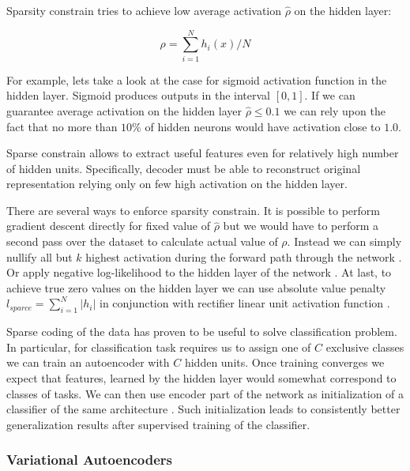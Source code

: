 Sparsity constrain tries to achieve low average activation $\hat{\rho}$ on the hidden layer:

\begin{equation}\label{eq:avgh}
  \rho = \sum_{i=1}^N h_i(x)/N
\end{equation}

For example, lets take a look at the case for sigmoid activation function in the hidden layer.
Sigmoid produces outputs in the interval $[0, 1]$. If we can guarantee average activation on the hidden layer $\hat{\rho} \leq 0.1$ we can rely upon the fact that no more than $10\%$ of hidden neurons would have activation close to $1.0$.

Sparse constrain allows to extract useful features even for relatively high number of hidden units. Specifically, decoder must be able to reconstruct original representation relying only on few high activation on the hidden layer.

There are several ways to enforce sparsity constrain.
It is possible to perform gradient descent directly for fixed value of $\hat{\rho}$ but we would have to perform a second pass over the dataset to calculate actual value of $\rho$. Instead we can simply nullify all but $k$ highest activation during the forward path through the network \cite{Kulkarni2015}.
Or apply negative log-likelihood to the hidden layer of the network \cite{Zhao2015}.
At last, to achieve true zero values on the hidden layer we can use absolute value penalty $l_{sparce}=\sum_{i=1}^N |h_i|$ in conjunction with rectifier linear unit activation function \cite{Glorot2011}.

Sparse coding of the data has proven to be useful to solve classification problem.
In particular, for classification task requires us to assign one of $C$ exclusive classes we can train an autoencoder with $C$ hidden units. Once training converges we expect that features, learned by the hidden layer would somewhat correspond to classes of tasks. We can then use encoder part of the network as initialization of a classifier of the same architecture \cite{Masci2011}.
Such initialization leads to consistently better generalization results after supervised training of the classifier.

\subsubsection{Variational Autoencoders}\label{ch:vae}



